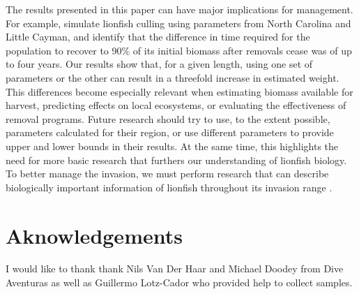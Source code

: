 \documentclass[fleqn,10pt,lineno]{wlpeerj} %
\begin{document}
The results presented in this paper can have major implications for
management. For example, \citet{edwards_2014} simulate lionfish culling
using parameters from North Carolina and Little Cayman, and identify
that the difference in time required for the population to recover to
90\% of its initial biomass after removals cease was of up to four
years. Our results show that, for a given length, using one set of
parameters or the other can result in a threefold increase in estimated
weight. This differences become especially relevant when estimating
biomass available for harvest, predicting effects on local ecosystems,
or evaluating the effectiveness of removal programs. Future research
should try to use, to the extent possible, parameters calculated for
their region, or use different parameters to provide upper and lower
bounds in their results. At the same time, this highlights the need for
more basic research that furthers our understanding of lionfish biology.
To better manage the invasion, we must perform research that can
describe biologically important information of lionfish throughout its
invasion range \citep{johnson_2016}.

\section*{Aknowledgements}

I would like to thank thank Nils Van Der Haar and Michael Doodey from
Dive Aventuras as well as Guillermo Lotz-Cador who provided help to
collect samples.


\end{document}
